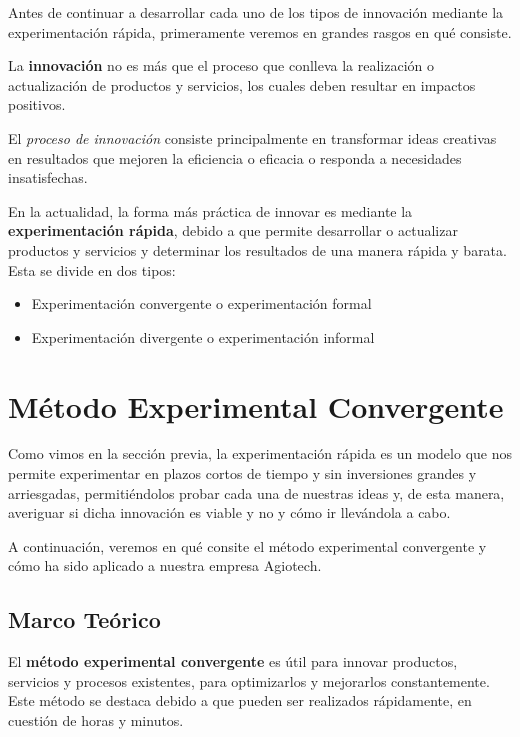 Antes de continuar a desarrollar cada uno de los tipos de innovación mediante la
experimentación rápida, primeramente veremos en grandes rasgos en qué consiste.

La \textbf{innovación} no es más que el proceso que conlleva la realización o actualización
de productos y servicios, los cuales deben resultar en impactos positivos.

El \textit{proceso de innovación} consiste principalmente en transformar ideas creativas
en resultados que mejoren la eficiencia o eficacia o responda a necesidades insatisfechas.

En la actualidad, la forma más práctica de innovar es mediante la \textbf{ experimentación
	rápida}, debido a que permite desarrollar o actualizar productos y servicios y
determinar los resultados de una manera rápida y barata. Esta se divide en dos tipos:

\begin{itemize}
	\item Experimentación convergente o experimentación formal

	\item Experimentación divergente o experimentación informal
\end{itemize}

\clearpage
\section{Método Experimental Convergente}

Como vimos en la sección previa, la experimentación rápida es un modelo que nos
permite experimentar en plazos cortos de tiempo y sin inversiones grandes y
arriesgadas, permitiéndolos probar cada una de nuestras ideas y, de esta manera,
averiguar si dicha innovación es viable y no y cómo ir llevándola a cabo.

A continuación, veremos en qué consite el método experimental convergente y cómo
ha sido aplicado a nuestra empresa Agiotech.

\subsection{Marco Teórico}

El \textbf{método experimental convergente} es útil para innovar productos, servicios
y procesos existentes, para optimizarlos y mejorarlos constantemente. Este método
se destaca debido a que pueden ser realizados rápidamente, en cuestión de horas
y minutos.

